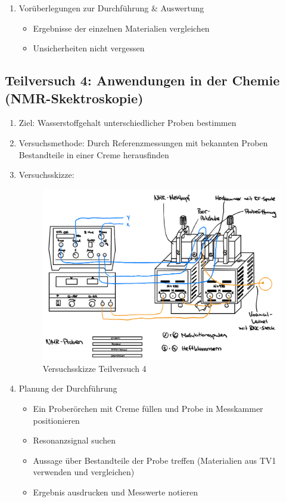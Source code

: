 \documentclass{article}
\begin{document}
\begin{enumerate}[label = (\Roman*)]
    \item Vorüberlegungen zur Durchführung \& Auswertung
        \begin{itemize}
            \item Ergebnisse der einzelnen Materialien vergleichen
            \item Unsicherheiten nicht vergessen
        \end{itemize}
        
\end{enumerate}


\newpage

\subsection{Teilversuch 4: Anwendungen in der Chemie (NMR-Skektroskopie)}
\begin{enumerate}[label = (\Roman*)]
    \item Ziel: Wasserstoffgehalt unterschiedlicher Proben bestimmen
    
    \item Versuchsmethode: Durch Referenzmessungen mit bekannten Proben Bestandteile in einer Creme herausfinden
    
    \item Versuchsskizze:
    
        \begin{figure}[H]
        \centering
        \includegraphics[width=0.7\linewidth]{Abbildungen/TV1-5.jpeg}
        \caption{Versuchsskizze Teilversuch 4}
        \end{figure}

    \item Planung der Durchführung
        \begin{itemize}
           \item Ein Proberörchen mit Creme füllen und Probe in Messkammer positionieren
           \item Resonanzsignal suchen
           \item Aussage über Bestandteile der Probe treffen (Materialien aus TV1 verwenden und vergleichen)
           \item Ergebnis ausdrucken und Messwerte notieren
        \end{itemize}


\end{enumerate}
\end{document}
